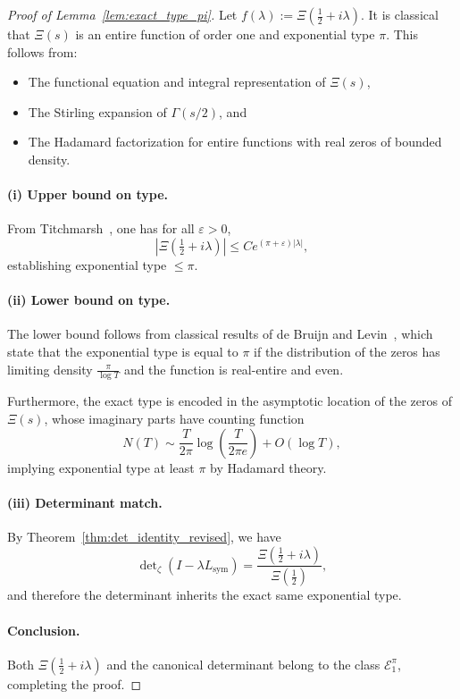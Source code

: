 \begin{proof}[Proof of Lemma~\ref{lem:exact_type_pi}]
Let \( f(\lambda) := \Xi\left( \tfrac{1}{2} + i\lambda \right) \). It is classical that \( \Xi(s) \) is an entire function of order one and exponential type \( \pi \). This follows from:

\begin{itemize}
  \item The functional equation and integral representation of \( \Xi(s) \),
  \item The Stirling expansion of \( \Gamma(s/2) \), and
  \item The Hadamard factorization for entire functions with real zeros of bounded density.
\end{itemize}

\paragraph{(i) Upper bound on type.}
From Titchmarsh~\cite[§10.5]{Titchmarsh1986Zeta}, one has for all \( \varepsilon > 0 \),
\[
|\Xi(\tfrac{1}{2} + i\lambda)| \le C e^{(\pi + \varepsilon)|\lambda|},
\]
establishing exponential type \( \le \pi \).

\paragraph{(ii) Lower bound on type.}
The lower bound follows from classical results of de Bruijn and Levin~\cite[Chap.~3]{Levin1996EntireLectures}, which state that the exponential type is equal to \( \pi \) if the distribution of the zeros has limiting density \( \frac{\pi}{\log T} \) and the function is real-entire and even.

Furthermore, the exact type is encoded in the asymptotic location of the zeros of \( \Xi(s) \), whose imaginary parts have counting function
\[
N(T) \sim \frac{T}{2\pi} \log\left(\frac{T}{2\pi e}\right) + O(\log T),
\]
implying exponential type at least \( \pi \) by Hadamard theory.

\paragraph{(iii) Determinant match.}
By Theorem~\ref{thm:det_identity_revised}, we have
\[
\det\nolimits_\zeta(I - \lambda L_{\mathrm{sym}}) = \frac{\Xi(\tfrac{1}{2} + i\lambda)}{\Xi(\tfrac{1}{2})},
\]
and therefore the determinant inherits the exact same exponential type.

\paragraph{Conclusion.}
Both \( \Xi(\tfrac{1}{2} + i\lambda) \) and the canonical determinant belong to the class \( \mathcal{E}_1^\pi \), completing the proof.
\end{proof}
%  